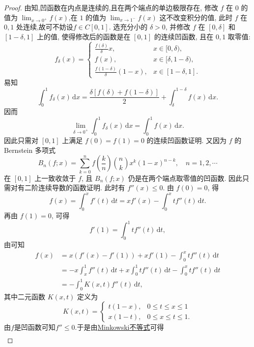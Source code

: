 \documentclass[../../main.tex]{subfiles}
\begin{document}
\begin{proof}
由知,凹函数在内点是连续的,且在两个端点的单边极限存在, 修改 \( f \) 在 \( 0 \) 的值为 \( \lim_{x \to 0^+} f(x) \),在 \( 1\) 的值为 \( \lim_{x \to 1^-} f(x) \) 这不改变积分的值, 此时 \( f \) 在 \( 0,1 \) 处连续,故可不妨设$f\in C[0,1]$. 选充分小的 \( \delta > 0 \), 并修改 \( f \) 在 \([0,\delta]\) 和 \([1 - \delta,1]\) 上的值, 使得修改后的函数是在 \([0,1]\) 的连续凹函数, 且在 \( 0,1 \) 取零值:
\[
f_{\delta}(x) = \begin{cases} 
\frac{f(\delta)}{\delta} x, & x \in [0,\delta), \\
f(x), & x \in [\delta,1 - \delta), \\
\frac{f(1 - \delta)}{\delta} (1 - x), & x \in [1 - \delta,1].
\end{cases}
\]
易知
\[
\int_{0}^{1} f_{\delta}(x) \, \mathrm{d}x = \frac{\delta [f(\delta) + f(1 - \delta)]}{2} + \int_{\delta}^{1 - \delta} f(x) \, \mathrm{d}x.
\]
因而
\[
\lim_{\delta \to 0^+} \int_{0}^{1} f_{\delta}(x) \, \mathrm{d}x = \int_{0}^{1} f(x) \, \mathrm{d}x.
\]
因此只需对 \([0,1]\) 上满足 \( f(0) = f(1) = 0 \) 的连续凹函数证明. 又因为 \( f \) 的 Bernstein 多项式
\[
B_n(f; x) = \sum_{k=0}^{n} f\left( \frac{k}{n} \right) \binom{n}{k} x^k (1 - x)^{n - k}, \quad n = 1,2,\cdots
\]
在 \([0,1]\) 上一致收敛于 \( f \), 且 \( B_n(f; x) \) 仍是在两个端点取零值的凹函数. 因此只需对有二阶连续导数的函数证明. 此时有 \( f''(x) \leqslant 0 \). 由 \( f(0) = 0 \), 得
\[
f(x) = \int_{0}^{x} f'(t) \, \mathrm{d}t = x f'(x) - \int_{0}^{x} t f''(t) \, \mathrm{d}t.
\]
再由 \( f(1) = 0 \), 可得
\[
f'(1) = \int_{0}^{1} t f''(t) \, \mathrm{d}t,
\]
由可知
\[
\begin{aligned}
f(x) &= x(f'(x) - f'(1)) + x f'(1) - \int_{0}^{x} t f''(t) \, \mathrm{d}t \\
&= -x \int_{x}^{1} f''(t) \, \mathrm{d}t + x \int_{0}^{1} t f''(t) \, \mathrm{d}t - \int_{0}^{x} t f''(t) \, \mathrm{d}t \\
&= - \int_{0}^{1} K(x, t) f''(t) \, \mathrm{d}t,
\end{aligned}
\]
其中二元函数 \( K(x, t) \) 定义为
\[
K(x, t) = \begin{cases} 
t(1 - x), & 0 \leqslant t \leqslant x \leqslant 1 \\
x(1 - t), & 0 \leqslant x \leqslant t \leqslant 1.
\end{cases}
\]
由$f$是凹函数可知$f''\leqslant 0$.于是由\hyperref[theorem:Minkowski(闵可夫斯基)不等式]{Minkowski不等式}可得
\[
\begin{aligned}

\end{aligned}\]
\end{proof}
\end{document}
